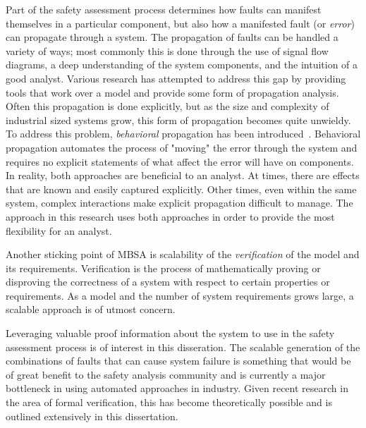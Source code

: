 Part of the safety assessment process determines how faults can manifest themselves in a particular component, but also how a manifested fault (or \emph{error}) can propagate through a system. The propagation of faults can be handled a variety of ways; most commonly this is done through the use of signal flow diagrams, a deep understanding of the system components, and the intuition of a good analyst. Various research has attempted to address this gap by providing tools that work over a model and provide some form of propagation analysis. Often this propagation is done explicitly, but as the size and complexity of industrial sized systems grow, this form of propagation becomes quite unwieldy. To address this problem, \emph{behavioral} propagation has been introduced~\cite{DBLP:conf/tacas/BittnerBCCGGMMZ16,stewart2020safety}. Behavioral propagation automates the process of "moving" the error through the system and requires no explicit statements of what affect the error will have on components. In reality, both approaches are beneficial to an analyst. At times, there are effects that are known and easily captured explicitly. Other times, even within the same system, complex interactions make explicit propagation difficult to manage. The approach in this research uses both approaches in order to provide the most flexibility for an analyst. 

Another sticking point of MBSA is scalability of the \emph{verification} of the model and its requirements. Verification is the process of mathematically proving or disproving the correctness of a system with respect to certain properties or requirements. As a model and the number of system requirements grows large, a scalable approach is of utmost concern.  

Leveraging valuable proof information about the system to use in the safety assessment process is of interest in this disseration. The scalable generation of the combinations of faults that can cause system failure is something that would be of great benefit to the safety analysis community and is currently a major bottleneck in using automated approaches in industry. Given recent research in the area of formal verification, this has become theoretically possible and is outlined extensively in this dissertation.

